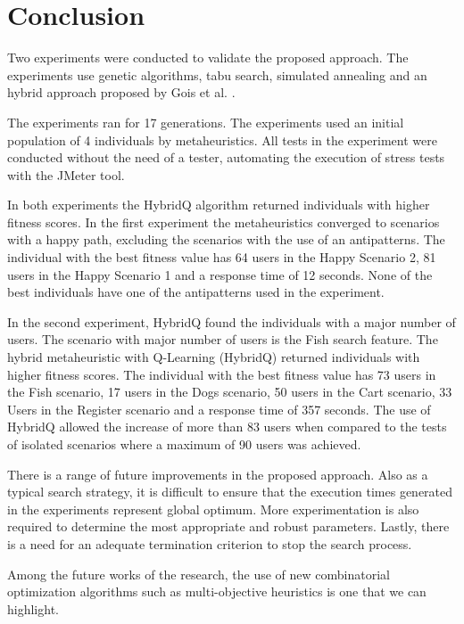 \documentclass{bmcart}
\begin{document}
\section{Conclusion}

Two experiments were conducted to validate the proposed approach. The experiments use genetic algorithms, tabu search, simulated annealing and an hybrid approach proposed by Gois et al. \citep{Gois2016}.

The experiments ran for 17 generations. The experiments used an initial population of 4 individuals by metaheuristics. All tests in the experiment were conducted without the need of a tester, automating the execution of stress tests with the JMeter tool.

In both experiments the HybridQ algorithm returned individuals with higher fitness scores.  In the first experiment the metaheuristics converged to scenarios with a happy path, excluding the scenarios with the use of an antipatterns. The individual with the best fitness value has 64 users in the Happy Scenario 2, 81 users in the Happy Scenario 1 and a response time of 12 seconds. None of the best individuals have one of the antipatterns used in the experiment.


In the second experiment, HybridQ found the individuals with a major number of users. The scenario with major number of users is the Fish search feature. The hybrid metaheuristic with Q-Learning (HybridQ) returned individuals with higher fitness scores.  The individual with the best fitness value has 73 users in the Fish scenario, 17 users in the Dogs scenario, 50 users in the Cart scenario, 33 Users in the Register scenario  and a response time of 357 seconds. The use of HybridQ allowed the increase of more than 83 users when compared to the tests of isolated scenarios where a maximum of 90 users was achieved.


There is a range of future improvements in the proposed approach. Also as a typical search strategy, it is difficult to ensure that the execution times generated in the experiments represent global optimum. More experimentation is also required to determine the most appropriate and robust parameters. Lastly, there is a need for an adequate termination criterion to stop the search process.

Among the future works of the research, the use of new combinatorial optimization algorithms such as multi-objective heuristics is one that we can highlight.
\end{document}
